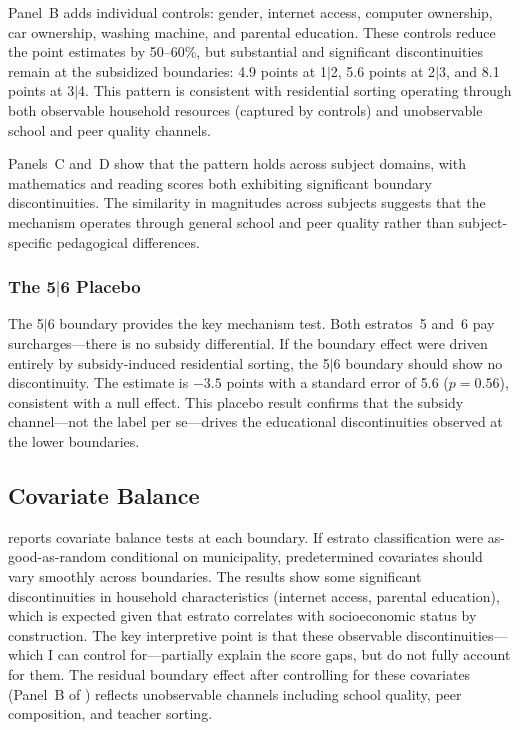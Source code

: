 \documentclass[12pt]{article}
\begin{document}
Panel~B adds individual controls: gender, internet access, computer ownership, car ownership, washing machine, and parental education. These controls reduce the point estimates by 50--60\%, but substantial and significant discontinuities remain at the subsidized boundaries: 4.9 points at 1$|$2, 5.6 points at 2$|$3, and 8.1 points at 3$|$4. This pattern is consistent with residential sorting operating through both observable household resources (captured by controls) and unobservable school and peer quality channels.

Panels~C and~D show that the pattern holds across subject domains, with mathematics and reading scores both exhibiting significant boundary discontinuities. The similarity in magnitudes across subjects suggests that the mechanism operates through general school and peer quality rather than subject-specific pedagogical differences.

\subsubsection*{The 5$|$6 Placebo} The 5$|$6 boundary provides the key mechanism test. Both estratos~5 and~6 pay surcharges---there is no subsidy differential. If the boundary effect were driven entirely by subsidy-induced residential sorting, the 5$|$6 boundary should show no discontinuity. The estimate is $-3.5$ points with a standard error of 5.6 ($p = 0.56$), consistent with a null effect. This placebo result confirms that the subsidy channel---not the label per se---drives the educational discontinuities observed at the lower boundaries.

\subsection{Covariate Balance}



 reports covariate balance tests at each boundary. If estrato classification were as-good-as-random conditional on municipality, predetermined covariates should vary smoothly across boundaries. The results show some significant discontinuities in household characteristics (internet access, parental education), which is expected given that estrato correlates with socioeconomic status by construction. The key interpretive point is that these observable discontinuities---which I can control for---partially explain the score gaps, but do not fully account for them. The residual boundary effect after controlling for these covariates (Panel~B of ) reflects unobservable channels including school quality, peer composition, and teacher sorting.
\end{document}
